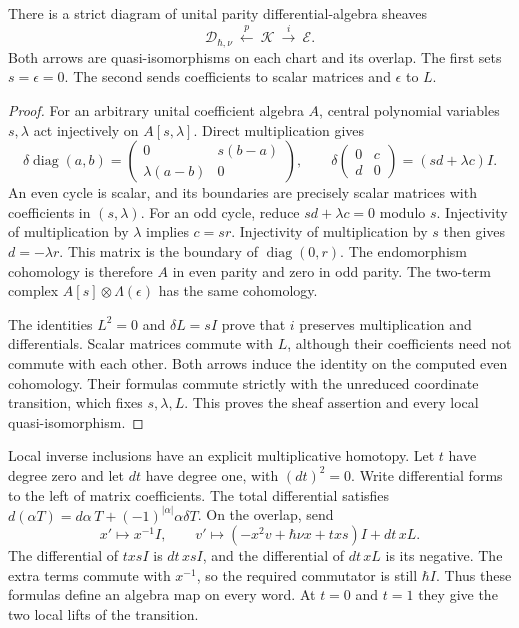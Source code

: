 \begin{proposition}\label{prop:qc-normal-sheaf}
There is a strict diagram of unital parity differential-algebra sheaves
\[
 \mathcal D_{\hbar,\nu}\ \xleftarrow{\ p\ }\
 \mathcal K\ \xrightarrow{\ i\ }\ \mathcal E.
\]
Both arrows are quasi-isomorphisms on each chart and its overlap.
The first sets $s=\epsilon=0$.
The second sends coefficients to scalar matrices and $\epsilon$ to $L$.
\end{proposition}
\begin{proof}
For an arbitrary unital coefficient algebra $A$, central polynomial variables $s,\lambda$ act injectively on $A[s,\lambda]$.
Direct multiplication gives
\[
 \delta\operatorname{diag}(a,b)=
 \begin{pmatrix}0&s(b-a)\\\lambda(a-b)&0\end{pmatrix},
 \qquad
 \delta\begin{pmatrix}0&c\\d&0\end{pmatrix}=(sd+\lambda c)I.
\]
An even cycle is scalar, and its boundaries are precisely scalar matrices with coefficients in $(s,\lambda)$.
For an odd cycle, reduce $sd+\lambda c=0$ modulo $s$.
Injectivity of multiplication by $\lambda$ implies $c=sr$.
Injectivity of multiplication by $s$ then gives $d=-\lambda r$.
This matrix is the boundary of $\operatorname{diag}(0,r)$.
The endomorphism cohomology is therefore $A$ in even parity and zero in odd parity.
The two-term complex $A[s]\otimes\Lambda(\epsilon)$ has the same cohomology.

The identities $L^2=0$ and $\delta L=sI$ prove that $i$ preserves multiplication and differentials.
Scalar matrices commute with $L$, although their coefficients need not commute with each other.
Both arrows induce the identity on the computed even cohomology.
Their formulas commute strictly with the unreduced coordinate transition, which fixes $s,\lambda,L$.
This proves the sheaf assertion and every local quasi-isomorphism.
\end{proof}

Local inverse inclusions have an explicit multiplicative homotopy.
Let $t$ have degree zero and let $dt$ have degree one, with $(dt)^2=0$.
Write differential forms to the left of matrix coefficients.
The total differential satisfies
$d(\alpha T)=d\alpha\,T+(-1)^{|\alpha|}\alpha\delta T$.
On the overlap, send
\[
 x'\longmapsto x^{-1}I,\qquad
 v'\longmapsto(-x^2v+\hbar\nu x+t xs)I+dt\,xL.
\]
The differential of $t xsI$ is $dt\,xsI$, and the differential of $dt\,xL$ is its negative.
The extra terms commute with $x^{-1}$, so the required commutator is still $\hbar I$.
Thus these formulas define an algebra map on every word.
At $t=0$ and $t=1$ they give the two local lifts of the transition.

